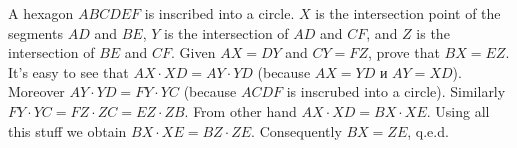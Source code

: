 \problem
A hexagon $ABCDEF$ is inscribed into a circle.
$X$ is the intersection point of the segments $AD$ and $BE$,
$Y$ is the intersection of $AD$ and $CF$,
and $Z$ is the intersection of $BE$ and $CF$.
Given $AX = DY$ and $CY = FZ$, prove that $BX = EZ$.
\solution
It's easy to see that $AX \cdot XD = AY \cdot YD$ (because $AX=YD$ и $AY=XD$).
Moreover $AY \cdot YD = FY \cdot YC$ (because $ACDF$ is inscrubed into a circle).
Similarly $FY \cdot YC = FZ \cdot ZC = EZ \cdot ZB$. From other hand $AX \cdot XD = BX \cdot XE$. Using all this stuff we obtain $BX \cdot XE = BZ \cdot ZE$.
Consequently $BX = ZE$, q.e.d.
\endproblem
